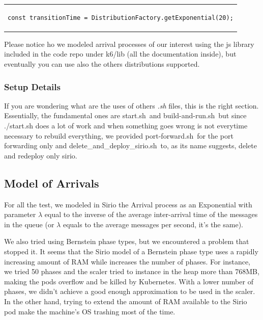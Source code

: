 \begin{table}[!htb]
\centering
\begin{tabular}{c}
\begin{lstlisting}
const transitionTime = DistributionFactory.getExponential(20);
\end{lstlisting}
\end{tabular}
\end{table}


Please notice ho we modeled arrival processes of our interest using the js library included in the code repo under k6/lib (all the documentation inside), but eventually you can use also the others distributions supported.

\subsubsection{Setup Details}

If you are wondering what are the uses of others \textit{.sh} files, this is the right section. Essentially, the fundamental ones are \guillemotleft start.sh\guillemotright \ and \guillemotleft build-and-run.sh\guillemotright \ but since ./start.sh does a lot of work and when something goes wrong is not everytime necessary to rebuild everything, we provided \guillemotleft port-forward.sh\guillemotright \ for the port forwarding only and \guillemotleft delete\_and\_deploy\_sirio.sh\guillemotright \ to, as its name suggests, delete and redeploy only sirio.

\subsection{Model of Arrivals}
For all the test, we modeled in Sirio the Arrival process as an Exponential with parameter $\lambda$ equal to the inverse of the average inter-arrival time of the messages in the queue (or $\lambda$ equals to the average messages per second, it's the same). 

We also tried using Bernstein phase types, but we encountered a problem that stopped it. It seems that the Sirio model of a Bernstein phase type uses a rapidly increasing amount of RAM while increases the number of phases. For instance, we tried 50 phases and the scaler tried to instance in the heap more than 768MB, making the pods overflow and be killed by Kubernetes. With a lower number of phases, we didn't achieve a good enough approximation to be used in the scaler. In the other hand, trying to extend the amount of RAM available to the Sirio pod make the machine's OS trashing most of the time.

